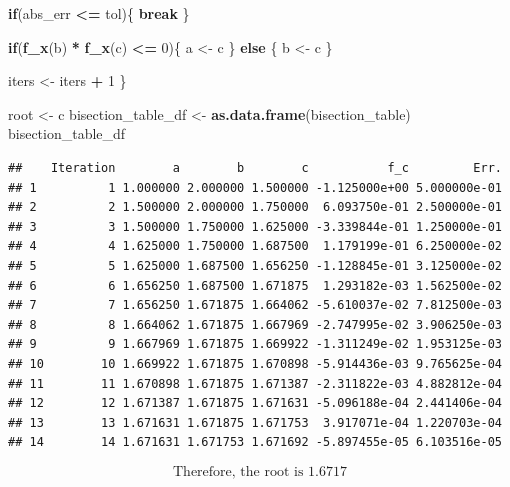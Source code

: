 \documentclass[
]{article}
\newenvironment{Shaded}{\begin{snugshade}}{\end{snugshade}}
\newcommand{\ControlFlowTok}[1]{\textcolor[rgb]{0.13,0.29,0.53}{\textbf{#1}}}
\newcommand{\DecValTok}[1]{\textcolor[rgb]{0.00,0.00,0.81}{#1}}
\newcommand{\FunctionTok}[1]{\textcolor[rgb]{0.13,0.29,0.53}{\textbf{#1}}}
\newcommand{\NormalTok}[1]{#1}
\newcommand{\OtherTok}[1]{\textcolor[rgb]{0.56,0.35,0.01}{#1}}
\newcommand{\SpecialCharTok}[1]{\textcolor[rgb]{0.81,0.36,0.00}{\textbf{#1}}}
\begin{document}
\begin{Shaded}
\begin{Highlighting}[]
  \ControlFlowTok{if}\NormalTok{(abs\_err }\SpecialCharTok{\textless{}=}\NormalTok{ tol)\{}
    \ControlFlowTok{break}
\NormalTok{  \}}
  
  \ControlFlowTok{if}\NormalTok{(}\FunctionTok{f\_x}\NormalTok{(b) }\SpecialCharTok{*} \FunctionTok{f\_x}\NormalTok{(c) }\SpecialCharTok{\textless{}=} \DecValTok{0}\NormalTok{)\{}
\NormalTok{    a }\OtherTok{\textless{}{-}}\NormalTok{ c}
\NormalTok{  \} }\ControlFlowTok{else}\NormalTok{ \{}
\NormalTok{    b }\OtherTok{\textless{}{-}}\NormalTok{ c}
\NormalTok{  \}}
  
\NormalTok{  iters }\OtherTok{\textless{}{-}}\NormalTok{ iters }\SpecialCharTok{+} \DecValTok{1}
\NormalTok{\}}

\NormalTok{root }\OtherTok{\textless{}{-}}\NormalTok{ c}
\NormalTok{bisection\_table\_df }\OtherTok{\textless{}{-}} \FunctionTok{as.data.frame}\NormalTok{(bisection\_table)}
\NormalTok{bisection\_table\_df}
\end{Highlighting}
\end{Shaded}

\begin{verbatim}
##    Iteration        a        b        c           f_c         Err.
## 1          1 1.000000 2.000000 1.500000 -1.125000e+00 5.000000e-01
## 2          2 1.500000 2.000000 1.750000  6.093750e-01 2.500000e-01
## 3          3 1.500000 1.750000 1.625000 -3.339844e-01 1.250000e-01
## 4          4 1.625000 1.750000 1.687500  1.179199e-01 6.250000e-02
## 5          5 1.625000 1.687500 1.656250 -1.128845e-01 3.125000e-02
## 6          6 1.656250 1.687500 1.671875  1.293182e-03 1.562500e-02
## 7          7 1.656250 1.671875 1.664062 -5.610037e-02 7.812500e-03
## 8          8 1.664062 1.671875 1.667969 -2.747995e-02 3.906250e-03
## 9          9 1.667969 1.671875 1.669922 -1.311249e-02 1.953125e-03
## 10        10 1.669922 1.671875 1.670898 -5.914436e-03 9.765625e-04
## 11        11 1.670898 1.671875 1.671387 -2.311822e-03 4.882812e-04
## 12        12 1.671387 1.671875 1.671631 -5.096188e-04 2.441406e-04
## 13        13 1.671631 1.671875 1.671753  3.917071e-04 1.220703e-04
## 14        14 1.671631 1.671753 1.671692 -5.897455e-05 6.103516e-05
\end{verbatim}

\[
\boxed{\text{Therefore, the root is } 1.6717}
\]
\end{document}

